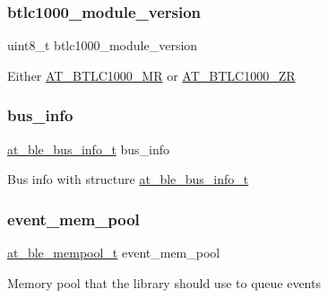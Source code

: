 \subsubsection{\texorpdfstring{btlc1000\_module\_version}{btlc1000\_module\_version}}
{\footnotesize\ttfamily uint8\+\_\+t btlc1000\+\_\+module\+\_\+version}

Either \mbox{\hyperlink{at__ble__api_8h_a536c416394376f5145cc8e4bf51abc04a42e736d65cc56d059a91af0474b2e7a1}{A\+T\+\_\+\+B\+T\+L\+C1000\+\_\+\+MR}} or \mbox{\hyperlink{at__ble__api_8h_a536c416394376f5145cc8e4bf51abc04a16ec900afdd29295b00bd2772283c358}{A\+T\+\_\+\+B\+T\+L\+C1000\+\_\+\+ZR}} \mbox{\label{structat__ble__init__config__t_acbd8e2d1e28485d88e8026f3892fa8b8}} 
\subsubsection{\texorpdfstring{bus\_info}{bus\_info}}
{\footnotesize\ttfamily \mbox{\hyperlink{structat__ble__bus__info__t}{at\+\_\+ble\+\_\+bus\+\_\+info\+\_\+t}} bus\+\_\+info}

Bus info with structure \mbox{\hyperlink{structat__ble__bus__info__t}{at\+\_\+ble\+\_\+bus\+\_\+info\+\_\+t}} \mbox{\label{structat__ble__init__config__t_aec15314f2b1e4cca55e174d971e598b8}} 
\subsubsection{\texorpdfstring{event\_mem\_pool}{event\_mem\_pool}}
{\footnotesize\ttfamily \mbox{\hyperlink{structat__ble__mempool__t}{at\+\_\+ble\+\_\+mempool\+\_\+t}} event\+\_\+mem\+\_\+pool}

Memory pool that the library should use to queue events \mbox{\label{structat__ble__init__config__t_a57e24de212ef8152213f6f74509efd66}} 
